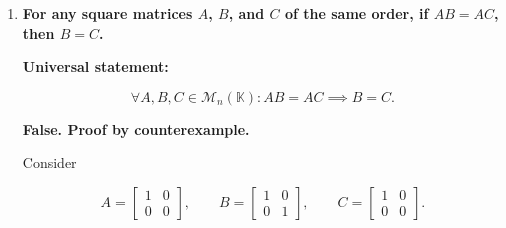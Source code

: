 \begin{enumerate}[label=\alph*)]
\begin{answer}
    $$
    \begin{aligned}
        AB=0_n
        &\implies A^{-1}(AB)=A^{-1}0_n \\
        &\implies (A^{-1}A)B=0_n \\
        &\implies I_nB=0_n \\
        &\implies \boxed{B=0_n}.
    \end{aligned}
    $$

    \par\smallskip
    \noindent\textit{Case 2: $B$ is invertible.}

    Multiplying by $B^{-1}$ on the right:

    $$
    \begin{aligned}
        AB=0_n
        &\implies (AB)B^{-1}=0_nB^{-1} \\
        &\implies A(BB^{-1})=0_n \\
        &\implies AI_n=0_n \\
        &\implies \boxed{A=0_n}.
    \end{aligned}
    $$

    Hence, if at least one factor is
    invertible, the other must be zero
    whenever $AB=0_n$.
\end{answer}


\item {\bfseries\boldmath
    For any square matrices $A$, $B$,
    and $C$ of the same order, if $AB=AC$,
    then $B=C$.
}

\begin{answer}
    \textbf{Universal statement:}

    $$
    \forall A,B,C\in\mathcal{M}_n(\mathbb{K}):
    AB=AC\implies B=C.
    $$

    \textbf{False. Proof by counterexample.}

    Consider

    $$
    A=\begin{bmatrix}
        1 & 0 \\
        0 & 0
    \end{bmatrix},
    \qquad
    B=\begin{bmatrix}
        1 & 0 \\
        0 & 1
    \end{bmatrix},
    \qquad
    C=\begin{bmatrix}
        1 & 0 \\
        0 & 0
    \end{bmatrix}.
    $$


\end{answer}
\end{enumerate}
